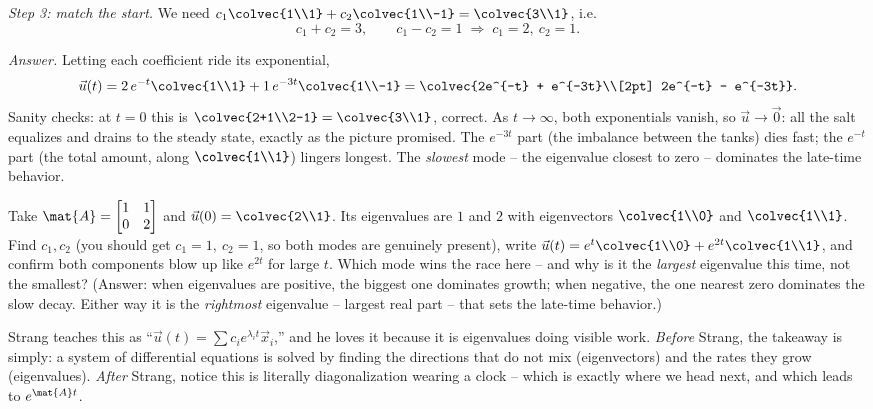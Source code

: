 \emph{Step 3: match the start.} We need $c_1\colvec{1\\1} + c_2\colvec{1\\-1} =
\colvec{3\\1}$, i.e.
\[
  c_1 + c_2 = 3, \qquad c_1 - c_2 = 1
  \;\Longrightarrow\; c_1 = 2,\ c_2 = 1.
\]

\emph{Answer.} Letting each coefficient ride its exponential,
\[
  \vec{u}(t)
  = 2\,e^{-t}\colvec{1\\1} + 1\,e^{-3t}\colvec{1\\-1}
  = \colvec{2e^{-t} + e^{-3t}\\[2pt] 2e^{-t} - e^{-3t}}.
\]
Sanity checks: at $t=0$ this is $\colvec{2+1\\2-1}=\colvec{3\\1}$, correct. As
$t\to\infty$, both exponentials vanish, so $\vec{u}\to\vec{0}$: all the salt
equalizes and drains to the steady state, exactly as the picture promised. The
$e^{-3t}$ part (the imbalance between the tanks) dies fast; the $e^{-t}$ part (the
total amount, along $\colvec{1\\1}$) lingers longest. The \emph{slowest} mode --
the eigenvalue closest to zero -- dominates the late-time behavior.

\begin{labbox}
Take $\mat{A}=\begin{bmatrix}1&1\\0&2\end{bmatrix}$ and $\vec{u}(0)=\colvec{2\\1}$.
Its eigenvalues are $1$ and $2$ with eigenvectors $\colvec{1\\0}$ and
$\colvec{1\\1}$. Find $c_1,c_2$ (you should get $c_1=1,\ c_2=1$, so both modes are
genuinely present), write $\vec{u}(t)=e^{t}\colvec{1\\0}+e^{2t}\colvec{1\\1}$, and
confirm both components blow up like $e^{2t}$ for large $t$. Which mode wins the
race here -- and why is it the \emph{largest} eigenvalue this time, not the
smallest? (Answer: when eigenvalues are positive, the biggest one dominates
growth; when negative, the one nearest zero dominates the slow decay. Either way
it is the \emph{rightmost} eigenvalue -- largest real part -- that sets the
late-time behavior.)
\end{labbox}

\begin{strangbox}
Strang teaches this as ``$\vec{u}(t) = \sum c_i e^{\lambda_i t}\vec{x}_i$,'' and he
loves it because it is eigenvalues doing visible work. \emph{Before} Strang, the
takeaway is simply: a system of differential equations is solved by finding the
directions that do not mix (eigenvectors) and the rates they grow (eigenvalues).
\emph{After} Strang, notice this is literally diagonalization wearing a clock --
which is exactly where we head next, and which leads to $e^{\mat{A}t}$.
\end{strangbox}

